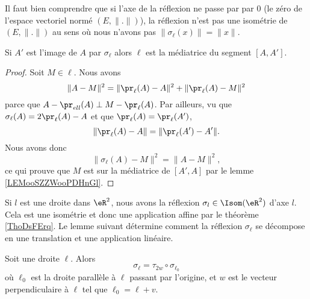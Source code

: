 \begin{remark}
    Il faut bien comprendre que si l'axe de la réflexion ne passe par par \( 0\) (le zéro de l'espace vectoriel normé \( (E,\| . \|)\)), la réflexion n'est pas une isométrie de \( (E,\| . \|)\) au sens où nous n'avons pas \( \| \sigma_{\ell}(x) \|=\| x \|\).
\end{remark}

\begin{lemma}       \label{LEMooTCIEooXdyuHu}
    Si \( A'\) est l'image de \( A\) par \( \sigma_{\ell}\) alors \( \ell\) est la médiatrice du segment \( [A,A']\).
\end{lemma}

\begin{proof}
    Soit \( M\in\ell\). Nous avons
    \begin{equation}
        \| A-M \|^2=\| \pr_{\ell}(A)-A \|^2+\| \pr_{\ell}(A)-M \|^2
    \end{equation}
    parce que \( A-\pr_{ell}(A)\perp M-\pr_{\ell}(A)\). Par ailleurs, vu que \( \sigma_{\ell}(A)=2\pr_{\ell}(A)-A\) et que \( \pr_{\ell}(A)=\pr_{\ell}(A')\),
    \begin{equation}
        \| \pr_{\ell}(A)-A \|=\| \pr_{\ell}(A')-A' \|.
    \end{equation}
    Nous avons donc
    \begin{equation}
        \| \sigma_{\ell}(A)-M \|^2=\| A-M \|^2,
    \end{equation}
    ce qui prouve que \( M\) est sur la médiatrice de \( [A',A]\) par le lemme \ref{LEMooSZZWooPDHnGl}.
\end{proof}

\begin{normaltext}
    Si \( l\) est une droite dans \( \eR^2\), nous avons la réflexion \( \sigma_l\in\Isom(\eR^2)\) d'axe \( l\). Cela est une isométrie et donc une application affine par le théorème \ref{ThoDsFErq}. Le lemme suivant détermine comment la réflexion \( \sigma_{\ell}\) se décompose en une translation et une application linéaire.
\end{normaltext}

\begin{lemma}   \label{LEMooVOJLooCFgdNG}
    Soit une droite \( \ell\). Alors
    \begin{equation}
        \sigma_{\ell}=\tau_{2w}\circ\sigma_{\ell_0}
    \end{equation}
    où \( \ell_0\) est la droite parallèle à \( \ell\) passant par l'origine, et \( w\) est le vecteur perpendiculaire à \( \ell\) tel que \( \ell_0=\ell+v\).
\end{lemma}

